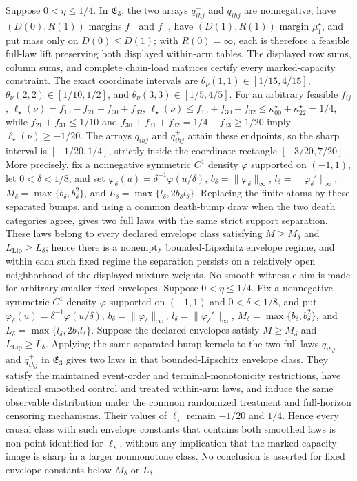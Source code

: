 Suppose \(0<\eta\leq1/4\).  In \(\mathfrak E_3\), the two arrays \(q^-_{ihj}\) and \(q^+_{ihj}\) are nonnegative, have \((D(0),R(1))\) margins \(f^-\) and \(f^+\), have \((D(1),R(1))\) margin \(\mu_1^\star\), and put mass only on \(D(0)\leq D(1)\); with \(R(0)=\infty\), each is therefore a feasible full-law lift preserving both displayed within-arm tables.  The displayed row sums, column sums, and complete chain-load matrices certify every marked-capacity constraint.  The exact coordinate intervals are \(\theta_\nu(1,1)\in[1/15,4/15]\), \(\theta_\nu(2,2)\in[1/10,1/2]\), and \(\theta_\nu(3,3)\in[1/5,4/5]\).  For an arbitrary feasible \(f_{ij}\), \(\ell_\star(\nu)=f_{10}-f_{21}+f_{30}+f_{32}\), \(\ell_\star(\nu)\leq f_{10}+f_{30}+f_{32}\leq\kappa^\star_{00}+\kappa^\star_{22}=1/4\), while \(f_{21}+f_{31}\leq1/10\) and \(f_{30}+f_{31}+f_{32}=1/4-f_{33}\geq1/20\) imply \(\ell_\star(\nu)\geq-1/20\).  The arrays \(q^-_{ihj}\) and \(q^+_{ihj}\) attain these endpoints, so the sharp interval is \([-1/20,1/4]\), strictly inside the coordinate rectangle \([-3/20,7/20]\).  More precisely, fix a nonnegative symmetric \(C^1\) density \(\varphi\) supported on \((-1,1)\), let \(0<\delta<1/8\), and set \(\varphi_\delta(u)=\delta^{-1}\varphi(u/\delta)\), \(b_\delta=\|\varphi_\delta\|_\infty\), \(l_\delta=\|\varphi_\delta'\|_\infty\), \(M_\delta=\max\{b_\delta,b_\delta^2\}\), and \(L_\delta=\max\{l_\delta,2b_\delta l_\delta\}\).  Replacing the finite atoms by these separated bumps, and using a common death-bump draw when the two death categories agree, gives two full laws with the same strict support separation.  These laws belong to every declared envelope class satisfying \(M\geq M_\delta\) and \(L_{\mathrm{Lip}}\geq L_\delta\); hence there is a nonempty bounded-Lipschitz envelope regime, and within each such fixed regime the separation persists on a relatively open neighborhood of the displayed mixture weights.  No smooth-witness claim is made for arbitrary smaller fixed envelopes.
Suppose \(0<\eta\leq1/4\).  Fix a nonnegative symmetric \(C^1\) density \(\varphi\) supported on \((-1,1)\) and \(0<\delta<1/8\), and put \(\varphi_\delta(u)=\delta^{-1}\varphi(u/\delta)\), \(b_\delta=\|\varphi_\delta\|_\infty\), \(l_\delta=\|\varphi_\delta'\|_\infty\), \(M_\delta=\max\{b_\delta,b_\delta^2\}\), and \(L_\delta=\max\{l_\delta,2b_\delta l_\delta\}\).  Suppose the declared envelopes satisfy \(M\geq M_\delta\) and \(L_{\mathrm{Lip}}\geq L_\delta\).  Applying the same separated bump kernels to the two full laws \(q^-_{ihj}\) and \(q^+_{ihj}\) in \(\mathfrak E_3\) gives two laws in that bounded-Lipschitz envelope class.  They satisfy the maintained event-order and terminal-monotonicity restrictions, have identical smoothed control and treated within-arm laws, and induce the same observable distribution under the common randomized treatment and full-horizon censoring mechanisms.  Their values of \(\ell_\star\) remain \(-1/20\) and \(1/4\).  Hence every causal class with such envelope constants that contains both smoothed laws is non-point-identified for \(\ell_\star\), without any implication that the marked-capacity image is sharp in a larger nonmonotone class.  No conclusion is asserted for fixed envelope constants below \(M_\delta\) or \(L_\delta\).

